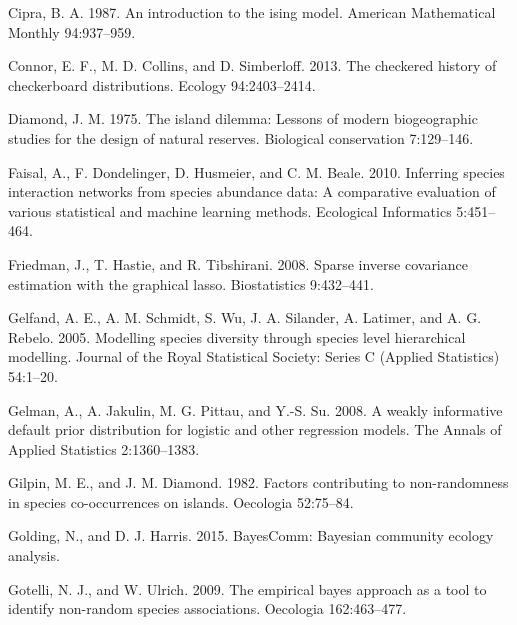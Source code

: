 \documentclass[12pt,]{article}
\begin{document}
\begin{spacing}{1.9}
\begin{flushleft}
Cipra, B. A. 1987. An introduction to the ising model. American
Mathematical Monthly 94:937--959.

Connor, E. F., M. D. Collins, and D. Simberloff. 2013. The checkered
history of checkerboard distributions. Ecology 94:2403--2414.

Diamond, J. M. 1975. The island dilemma: Lessons of modern biogeographic
studies for the design of natural reserves. Biological conservation
7:129--146.

Faisal, A., F. Dondelinger, D. Husmeier, and C. M. Beale. 2010.
Inferring species interaction networks from species abundance data: A
comparative evaluation of various statistical and machine learning
methods. Ecological Informatics 5:451--464.

Friedman, J., T. Hastie, and R. Tibshirani. 2008. Sparse inverse
covariance estimation with the graphical lasso. Biostatistics
9:432--441.

Gelfand, A. E., A. M. Schmidt, S. Wu, J. A. Silander, A. Latimer, and A.
G. Rebelo. 2005. Modelling species diversity through species level
hierarchical modelling. Journal of the Royal Statistical Society: Series
C (Applied Statistics) 54:1--20.

Gelman, A., A. Jakulin, M. G. Pittau, and Y.-S. Su. 2008. A weakly
informative default prior distribution for logistic and other regression
models. The Annals of Applied Statistics 2:1360--1383.

Gilpin, M. E., and J. M. Diamond. 1982. Factors contributing to
non-randomness in species co-occurrences on islands. Oecologia
52:75--84.

Golding, N., and D. J. Harris. 2015. BayesComm: Bayesian community
ecology analysis.

Gotelli, N. J., and W. Ulrich. 2009. The empirical bayes approach as a
tool to identify non-random species associations. Oecologia
162:463--477.


\end{flushleft}
\end{spacing}
\end{document}
